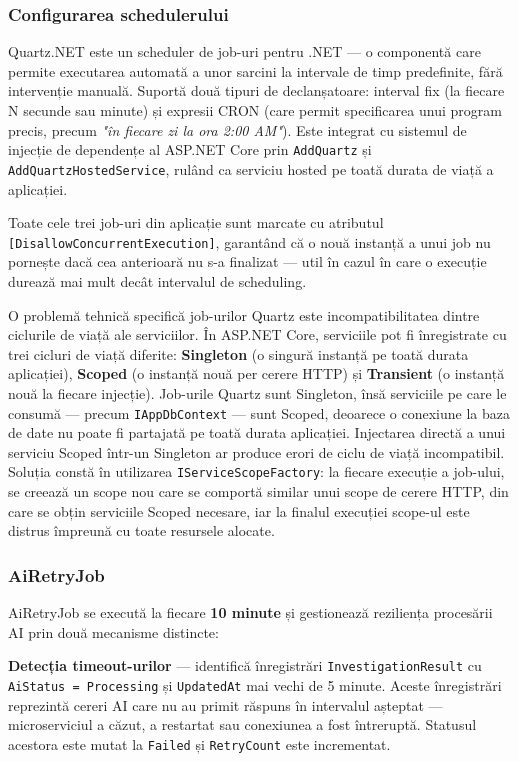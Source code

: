 \documentclass[12pt, a4paper]{report}
\begin{document}
\subsubsection{Configurarea schedulerului}

Quartz.NET este un scheduler de job-uri pentru .NET --- o componentă care permite
executarea automată a unor sarcini la intervale de timp predefinite, fără
intervenție manuală. Suportă două tipuri de declanșatoare: interval fix (la fiecare
N secunde sau minute) și expresii CRON (care permit specificarea unui program precis,
precum \textit{"în fiecare zi la ora 2:00 AM"}). Este integrat cu sistemul de
injecție de dependențe al ASP.NET Core prin \texttt{AddQuartz} și
\texttt{AddQuartzHostedService}, rulând ca serviciu hosted pe toată durata de viață
a aplicației.

Toate cele trei job-uri din aplicație sunt marcate cu atributul
\texttt{[DisallowConcurrentExecution]}, garantând că o nouă instanță a unui job
nu pornește dacă cea anterioară nu s-a finalizat --- util în cazul în care o
execuție durează mai mult decât intervalul de scheduling.

O problemă tehnică specifică job-urilor Quartz este incompatibilitatea dintre
ciclurile de viață ale serviciilor. În ASP.NET Core, serviciile pot fi înregistrate
cu trei cicluri de viață diferite: \textbf{Singleton} (o singură instanță pe toată
durata aplicației), \textbf{Scoped} (o instanță nouă per cerere HTTP) și
\textbf{Transient} (o instanță nouă la fiecare injecție). Job-urile Quartz sunt
Singleton, însă serviciile pe care le consumă --- precum \texttt{IAppDbContext} ---
sunt Scoped, deoarece o conexiune la baza de date nu poate fi partajată pe toată
durata aplicației. Injectarea directă a unui serviciu Scoped într-un Singleton ar
produce erori de ciclu de viață incompatibil. Soluția constă în utilizarea
\texttt{IServiceScopeFactory}: la fiecare execuție a job-ului, se creează un scope
nou care se comportă similar unui scope de cerere HTTP, din care se obțin serviciile
Scoped necesare, iar la finalul execuției scope-ul este distrus împreună cu toate
resursele alocate.


\subsubsection{AiRetryJob}

AiRetryJob se execută la fiecare \textbf{10 minute} și gestionează
reziliența procesării AI prin două mecanisme distincte:

\textbf{Detecția timeout-urilor} --- identifică înregistrări
\texttt{InvestigationResult} cu \texttt{AiStatus = Processing} și
\texttt{UpdatedAt} mai vechi de 5 minute. Aceste înregistrări reprezintă cereri
AI care nu au primit răspuns în intervalul așteptat --- microserviciul a căzut,
a restartat sau conexiunea a fost întreruptă. Statusul acestora este mutat la
\texttt{Failed} și \texttt{RetryCount} este incrementat.
\end{document}
